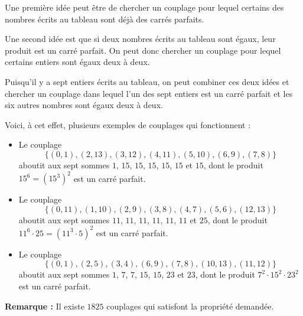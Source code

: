 Une première idée peut être de chercher un couplage pour lequel certains des nombres écrits au tableau sont déjà des carrés parfaits.

Une second idée est que si deux nombres écrits au tableau sont égaux, leur produit est un carré parfait. On peut donc chercher un couplage pour lequel certains entiers sont égaux deux à deux.

Puisqu'il y a sept entiers écrits au tableau, on peut combiner ces deux idées et chercher un couplage dans lequel l'un des sept entiers est un carré parfait et les six autres nombres sont égaux deux à deux. 

Voici, à cet effet, plusieurs exemples de couplages qui fonctionnent :

\begin{itemize}
\item Le couplage
$$\{(0,1), (2,13), (3,12),(4,11),(5,10),(6,9), (7,8)\}$$
aboutit aux sept sommes $1$, $15$, $15$, $15$, $15$, $15$ et $15$, dont le produit $15^6=(15^3)^2$ est un carré parfait.

\item Le couplage
$$\{(0,11),(1,10),(2,9),(3,8),(4,7),(5,6),(12,13)\}$$
aboutit aux sept sommes $11$, $11$, $11$, $11$, $11$, $11$ et $25$, dont le produit $11^6\cdot 25= (11^3\cdot 5)^2$ est un carré parfait. 

\item Le couplage
$$\{(0,1),(2,5),(3,4),(6,9),(7,8),(10,13),(11,12)\}$$
aboutit aux sept sommes $1$, $7$, $7$, $15$, $15$, $23$ et $23$, dont le produit $7^2\cdot 15^2\cdot 23^2$ est un carré parfait. 
\end{itemize}

\textbf{Remarque :} Il existe $1825$ couplages qui satisfont la propriété demandée.